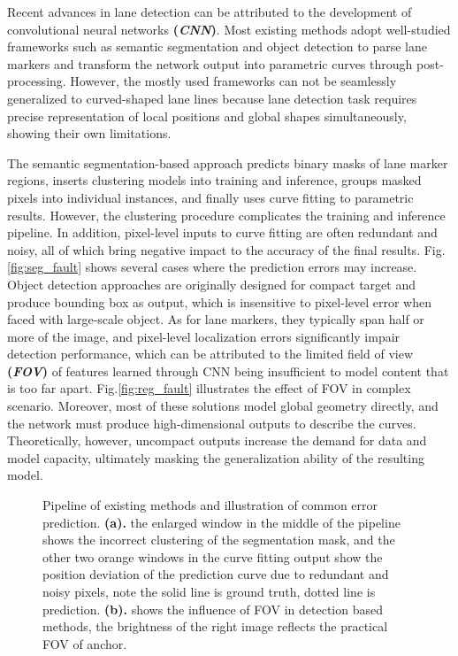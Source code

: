 \documentclass[final]{cvpr}
\begin{document}
Recent advances in lane detection can be attributed to the development of convolutional neural networks \textbf{(\textit{CNN})}. Most existing methods adopt well-studied frameworks such as semantic segmentation and object detection to parse lane markers and transform the network output into parametric curves through post-processing. However, the mostly used frameworks can not be seamlessly generalized to curved-shaped lane lines because lane detection task requires precise representation of local positions and global shapes simultaneously, showing their own limitations.

The semantic segmentation-based approach predicts binary masks of lane marker regions, inserts clustering models into training and inference, groups masked pixels into individual instances, and finally uses curve fitting to parametric results. However, the clustering procedure complicates the training and inference pipeline. In addition, pixel-level inputs to curve fitting are often redundant and noisy, all of which bring negative impact to the accuracy of the final results. Fig.\ref{fig:seg_fault} shows several cases where the prediction errors may increase. Object detection approaches are originally designed for compact target and produce bounding box as output, which is insensitive to pixel-level error when faced with large-scale object. As for lane markers, they typically span half or more of the image, and pixel-level localization errors significantly impair detection performance, which can be attributed to the limited field of view \textbf{(\textit{FOV})} of features learned through CNN being insufficient to model content that is too far apart. Fig.\ref{fig:reg_fault} illustrates the effect of FOV in complex scenario. Moreover, most of these solutions model global geometry directly, and the network must produce high-dimensional outputs to describe the curves. Theoretically, however, uncompact outputs increase the demand for data and model capacity, ultimately masking the generalization ability of the resulting model.

\begin{figure}[htbp]
	\centering
	\quad
	\caption{Pipeline of existing methods and illustration of common error prediction. \textbf{(a).} the enlarged window in the middle of the pipeline shows the incorrect clustering of the segmentation mask, and the other two orange windows in the curve fitting output show the position deviation of the prediction curve due to redundant and noisy pixels, note the solid line is ground truth, dotted line is prediction. \textbf{(b).} shows the influence of FOV in detection based methods, the brightness of the right image reflects the practical FOV of anchor.}
	\label{examples of disadvantages of previous methods.}
\end{figure}
\end{document}
